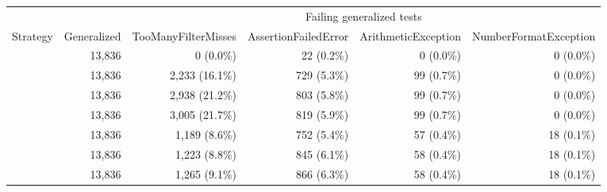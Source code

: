   \renewcommand{\theHreporttablerow}{tab-exclusions-test-failures.\arabic{reporttablerow}}
  \setcounter{reporttablerow}{0}
  \begin{tabular*}{\linewidth}{@{\hspace{\tabcolsep}\extracolsep{\fill}}lrrrrr}
  \toprule
   &  & \multicolumn{4}{c}{Failing generalized tests} \\
  \cmidrule(lr){3-6}
  Strategy & Generalized & \multicolumn{1}{c}{TooManyFilterMisses} & \multicolumn{1}{c}{AssertionFailedError} & \multicolumn{1}{c}{ArithmeticException} & \multicolumn{1}{c}{NumberFormatException} \\
  \midrule
  {reporttablerow}\label{tabrow:tab-exclusions-test-failures:BASELINE}\VariantBaseline{} & 13,836 & 0\; (\phantom{0}0.0\%) & 22\; (0.2\%) & 0\; (0.0\%) & 0\; (0.0\%) \\
  {reporttablerow}\label{tabrow:tab-exclusions-test-failures:NAIVE_10_TRIES}\VariantNaiveA{} & 13,836 & 2,233\; (16.1\%) & 729\; (5.3\%) & 99\; (0.7\%) & 0\; (0.0\%) \\
  {reporttablerow}\label{tabrow:tab-exclusions-test-failures:NAIVE_50_TRIES}\VariantNaiveB{} & 13,836 & 2,938\; (21.2\%) & 803\; (5.8\%) & 99\; (0.7\%) & 0\; (0.0\%) \\
  {reporttablerow}\label{tabrow:tab-exclusions-test-failures:NAIVE_200_TRIES}\VariantNaiveC{} & 13,836 & 3,005\; (21.7\%) & 819\; (5.9\%) & 99\; (0.7\%) & 0\; (0.0\%) \\
  {reporttablerow}\label{tabrow:tab-exclusions-test-failures:IMPROVED_10_TRIES}\VariantImprovedA{} & 13,836 & 1,189\; (\phantom{0}8.6\%) & 752\; (5.4\%) & 57\; (0.4\%) & 18\; (0.1\%) \\
  {reporttablerow}\label{tabrow:tab-exclusions-test-failures:IMPROVED_50_TRIES}\VariantImprovedB{} & 13,836 & 1,223\; (\phantom{0}8.8\%) & 845\; (6.1\%) & 58\; (0.4\%) & 18\; (0.1\%) \\
  {reporttablerow}\label{tabrow:tab-exclusions-test-failures:IMPROVED_200_TRIES}\VariantImprovedC{} & 13,836 & 1,265\; (\phantom{0}9.1\%) & 866\; (6.3\%) & 58\; (0.4\%) & 18\; (0.1\%) \\
  \bottomrule
  \end{tabular*}
